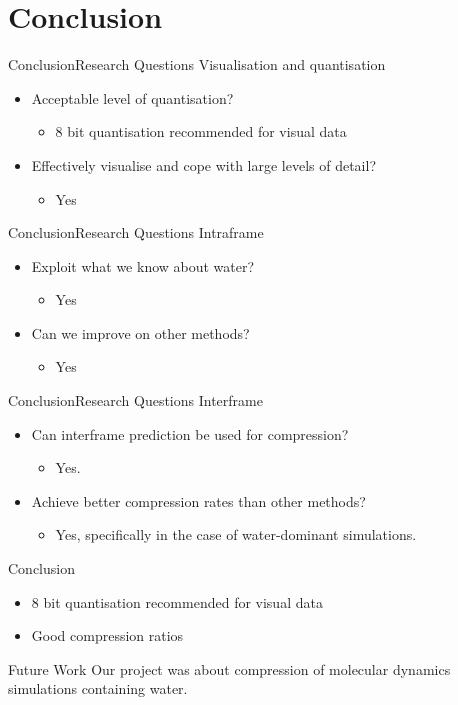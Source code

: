 \documentclass{beamer}
\begin{document}
\section{Conclusion}
\begin{frame}{Conclusion}{Research Questions}
Visualisation and quantisation
\begin{itemize}
 \item Acceptable level of quantisation?
 \begin{itemize}
  \item 8 bit quantisation recommended for visual data
 \end{itemize}
 \item Effectively visualise and cope with large levels of detail?
 \begin{itemize}
  \item Yes
 \end{itemize}
\end{itemize}
\end{frame}

\begin{frame}{Conclusion}{Research Questions}
Intraframe
\begin{itemize}
 \item Exploit what we know about water?
 \begin{itemize}
  \item Yes
 \end{itemize}
 \item Can we improve on other methods?
 \begin{itemize}
  \item Yes
 \end{itemize}
\end{itemize}
\end{frame}

\begin{frame}{Conclusion}{Research Questions}
Interframe
\begin{itemize}
 \item Can interframe prediction be used for compression?
 \begin{itemize}
  \item Yes.
 \end{itemize}
 \item Achieve better compression rates than other methods?
 \begin{itemize}
  \item Yes, specifically in the case of water-dominant simulations.
 \end{itemize}
\end{itemize}
\end{frame}

\begin{frame}{Conclusion}
\begin{itemize}
 \item 8 bit quantisation recommended for visual data
 \item Good compression ratios
\end{itemize}
\end{frame}

\begin{frame}{Future Work}
Our project was about compression of molecular dynamics simulations containing water.
\end{frame}
\end{document}
